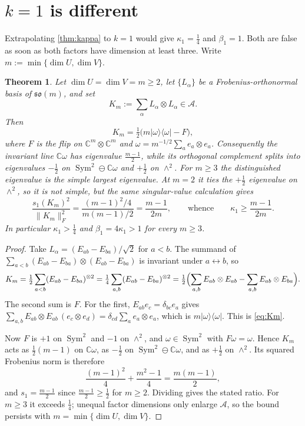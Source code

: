\documentclass[11pt,reqno]{amsart}
\theoremstyle{plain}
\newtheorem{theorem}{Theorem}[section]
\theoremstyle{remark}
\newcommand{\ketbra}[2]{\lvert #1\rangle\!\langle #2\rvert}
\newcommand{\norm}[1]{\lVert #1\rVert}
\newcommand{\C}{\mathbb C}
\begin{document}
\section{\texorpdfstring{$k=1$}{k = 1} is different}

Extrapolating \cref{thm:kappa} to $k=1$ would give $\kappa_1=\frac14$ and
$\beta_1=1$.  Both are false as soon as both factors have dimension at least
three.  Write $m:=\min\{\dim U,\dim V\}$.

\begin{theorem}
\label{thm:k1}
Let $\dim U=\dim V=m\ge2$, let $\{L_\alpha\}$ be a Frobenius-orthonormal basis
of $\mathfrak{so}(m)$, and set
\[
    K_m:=\sum_\alpha L_\alpha\otimes L_\alpha\in\mathcal A .
\]
Then
\begin{equation}
\label{eq:Km}
    K_m=\tfrac12\bigl(m\ketbra\omega\omega-F\bigr),
\end{equation}
where $F$ is the flip on $\C^m\otimes\C^m$ and
$\omega=m^{-1/2}\sum_ae_a\otimes e_a$.  Consequently the invariant line
$\C\omega$ has eigenvalue $\frac{m-1}2$, while its orthogonal complement
splits into eigenvalues $-\frac12$ on
$\operatorname{Sym}^2\ominus\C\omega$ and $+\frac12$ on $\wedge^2$.
For $m\ge3$ the distinguished eigenvalue is the simple largest eigenvalue.
At $m=2$ it ties the $+\frac12$ eigenvalue on $\wedge^2$, so it is not simple,
but the same singular-value calculation gives
\[
    \frac{s_1(K_m)^2}{\norm{K_m}_F^2}
    =\frac{(m-1)^2/4}{m(m-1)/2}
    =\frac{m-1}{2m},
    \qquad\text{whence}\qquad
    \kappa_1\ge\frac{m-1}{2m} .
\]
In particular $\kappa_1>\frac14$ and $\beta_1=4\kappa_1>1$ for every $m\ge3$.
\end{theorem}

\begin{proof}
Take $L_\alpha=(E_{ab}-E_{ba})/\sqrt2$ for $a<b$.  The summand of
$\sum_{a<b}(E_{ab}-E_{ba})\otimes(E_{ab}-E_{ba})$ is invariant under $a\leftrightarrow b$,
so
\[
    K_m
    =\tfrac12\sum_{a<b}(E_{ab}-E_{ba})^{\otimes2}
    =\tfrac14\sum_{a,b}(E_{ab}-E_{ba})^{\otimes2}
    =\tfrac12\Bigl(\sum_{a,b}E_{ab}\otimes E_{ab}
                  -\sum_{a,b}E_{ab}\otimes E_{ba}\Bigr).
\]
The second sum is $F$.  For the first, $E_{ab}e_c=\delta_{bc}e_a$ gives
$\sum_{a,b}E_{ab}\otimes E_{ab}\,(e_c\otimes e_d)=\delta_{cd}\sum_ae_a\otimes e_a$,
which is $m\ketbra\omega\omega$.  This is \cref{eq:Km}.

Now $F$ is $+1$ on $\operatorname{Sym}^2$ and $-1$ on $\wedge^2$, and
$\omega\in\operatorname{Sym}^2$ with $F\omega=\omega$.  Hence $K_m$ acts as
$\frac12(m-1)$ on $\C\omega$, as $-\frac12$ on
$\operatorname{Sym}^2\ominus\C\omega$, and as $+\frac12$ on $\wedge^2$.  Its
squared Frobenius norm is therefore
\[
    \frac{(m-1)^2}4+\frac{m^2-1}4=\frac{m(m-1)}2,
\]
and $s_1=\frac{m-1}2$ since $\frac{m-1}2\ge\frac12$ for $m\ge2$.  Dividing gives
the stated ratio.  For $m\ge3$ it exceeds $\frac14$; unequal factor dimensions
only enlarge $\mathcal A$, so the bound persists with $m=\min\{\dim U,\dim V\}$.
\end{proof}
\end{document}

